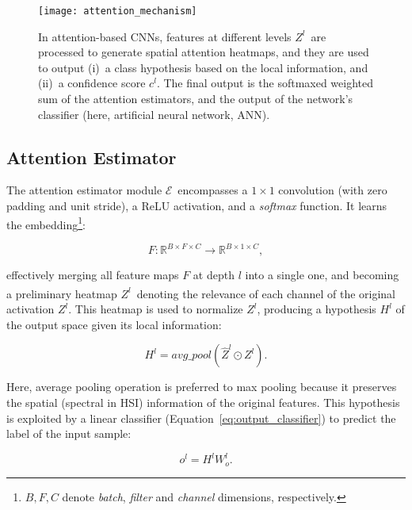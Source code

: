 \documentclass[journal]{IEEEtran}
\newcommand{\Activation}{$\mathit{Z}^ {l}$}
\newcommand{\SoftmaxActivation}{$\hat{\mathit{Z}^{l}}$}
\newcommand{\AttentionEstimator}{$\mathcal{E}$}
\begin{document}
\begin{figure}[h]
\centering
\texttt{[image: attention\_mechanism]}
\caption{In attention-based CNNs, features at different levels \Activation~are processed to generate spatial attention heatmaps, and they are used to output (i)~a class hypothesis based on the local information, and (ii)~a confidence score $c^{l}$. The final output is the softmaxed weighted sum of the attention estimators, and the output of the network's classifier (here, artificial neural network, ANN).}
\label{attention_mechanism}
\end{figure}



\subsection{Attention Estimator}\label{sec:attention_estimator}

The attention estimator module \AttentionEstimator~encompasses a $1\times 1$ convolution (with zero padding and unit stride), a ReLU activation, and a \emph{softmax} function. It learns the embedding\footnote{$B, F, C$ denote \textit{batch}, \textit{filter} and \textit{channel} dimensions, respectively.}:

\begin{equation}
F : \mathbb{R}^{B\times F\times C}\rightarrow \mathbb{R}^{B\times 1\times C},
\end{equation}

\noindent effectively merging all feature maps $F$ at depth $l$ into a single one, and becoming a preliminary heatmap \SoftmaxActivation~denoting the relevance of each channel of the original activation \Activation. This heatmap is used to normalize \Activation, producing a hypothesis $H^{l}$ of the output space given its local information:

\begin{equation}
H^{l}=avg\_pool(\hat{Z}^{l}\odot Z^{l}).
\end{equation}

\noindent Here, average pooling operation is preferred to max pooling because it preserves the spatial (spectral in HSI) information of the original features. This hypothesis is exploited by a linear classifier (Equation~\ref{eq:output_classifier}) to predict the label of the input sample:

\begin{equation}
o^{l}=H^{l}W_{o}^{l}.
\label{eq:output_classifier}
\end{equation}
\end{document}
